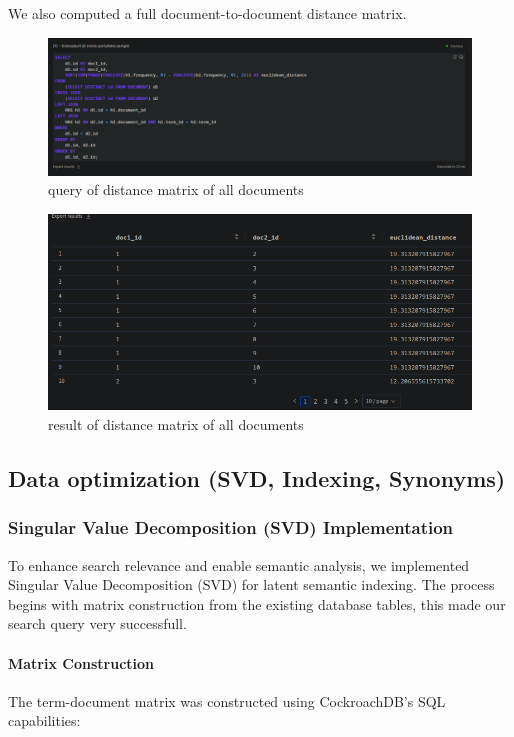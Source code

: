 \documentclass[twoside]{article}
\begin{document}
We also computed a full document-to-document distance matrix.

\begin{figure}[H]
  \centering
  \includegraphics[width=1\textwidth]{imgs/distancematrixq.png}
  \caption{query of distance matrix of all documents}
  \label{fig:5}
\end{figure}

\begin{figure}[H]
  \centering
  \includegraphics[width=1\textwidth]{imgs/distancematrixr.png}
  \caption{result of distance matrix of all documents}
  \label{fig:6}
\end{figure}

\subsection{Data optimization (SVD, Indexing, Synonyms)}

\subsubsection{Singular Value Decomposition (SVD) Implementation}

To enhance search relevance and enable semantic analysis, we implemented Singular Value Decomposition (SVD) for latent semantic indexing. The process begins with matrix construction from the existing database tables, this made our search query very successfull.

\paragraph{Matrix Construction}
The term-document matrix was constructed using CockroachDB's SQL capabilities:
\end{document}
